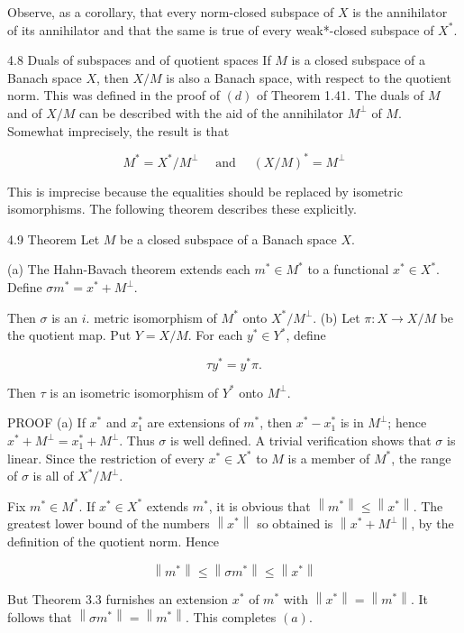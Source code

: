 \documentclass[10pt]{article}
\begin{document}
Observe, as a corollary, that every norm-closed subspace of $X$ is the annihilator of its annihilator and that the same is true of every weak*-closed subspace of $X^{*}$.

4.8 Duals of subspaces and of quotient spaces If $M$ is a closed subspace of a Banach space $X$, then $X / M$ is also a Banach space, with respect to the quotient norm. This was defined in the proof of $(d)$ of Theorem 1.41. The duals of $M$ and of $X / M$ can be described with the aid of the annihilator $M^{\perp}$ of $M$. Somewhat imprecisely, the result is that

$$
M^{*}=X^{*} / M^{\perp} \quad \text { and } \quad(X / M)^{*}=M^{\perp}
$$

This is imprecise because the equalities should be replaced by isometric isomorphisms. The following theorem describes these explicitly.

4.9 Theorem Let $M$ be a closed subspace of a Banach space $X$.

(a) The Hahn-Bavach theorem extends each $m^{*} \in M^{*}$ to a functional $x^{*} \in X^{*}$. Define $\sigma m^{*}=x^{*}+M^{\perp}$.

Then $\sigma$ is an $i$. metric isomorphism of $M^{*}$ onto $X^{*} / M^{\perp}$.
(b) Let $\pi: X \rightarrow X / M$ be the quotient map. Put $Y=X / M$. For each $y^{*} \in Y^{*}$, define

$$
\tau y^{*}=y^{*} \pi .
$$

Then $\tau$ is an isometric isomorphism of $Y^{*}$ onto $M^{\perp}$.

PROOF (a) If $x^{*}$ and $x_{1}^{*}$ are extensions of $m^{*}$, then $x^{*}-x_{1}^{*}$ is in $M^{\perp}$; hence $x^{*}+M^{\perp}=x_{1}^{*}+M^{\perp}$. Thus $\sigma$ is well defined. A trivial verification shows that $\sigma$ is linear. Since the restriction of every $x^{*} \in X^{*}$ to $M$ is a member of $M^{*}$, the range of $\sigma$ is all of $X^{*} / M^{\perp}$.

Fix $m^{*} \in M^{*}$. If $x^{*} \in X^{*}$ extends $m^{*}$, it is obvious that $\left\|m^{*}\right\| \leq\left\|x^{*}\right\|$. The greatest lower bound of the numbers $\left\|x^{*}\right\|$ so obtained is $\left\|x^{*}+M^{\perp}\right\|$, by the definition of the quotient norm. Hence

$$
\left\|m^{*}\right\| \leq\left\|\sigma m^{*}\right\| \leq\left\|x^{*}\right\|
$$

But Theorem 3.3 furnishes an extension $x^{*}$ of $m^{*}$ with $\left\|x^{*}\right\|=\left\|m^{*}\right\|$. It follows that $\left\|\sigma m^{*}\right\|=\left\|m^{*}\right\|$. This completes $(a)$.
\end{document}
